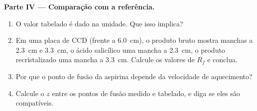 \begin{problem}
\noindent\textbf{Parte IV --- Comparação com a referência.}
\begin{enumerate}[resume]
  \item O valor tabelado é dado na unidade. Que  isso
        implica?
  \item Em uma placa de CCD (frente a \qty{6.0}{cm}), o produto bruto mostra
        manchas a \qty{2.3}{cm} e \qty{3.3}{cm}, o ácido salicílico uma
        mancha a \qty{2.3}{cm}, o produto recristalizado uma mancha a
        \qty{3.3}{cm}. Calcule os valores de $R_f$ e conclua.
  \item Por que o ponto de fusão da aspirina depende da velocidade de
        aquecimento?
  \item Calcule o  $z$ entre os pontos de fusão medido e
        tabelado, e diga se eles são compatíveis.
\end{enumerate}
\end{problem}
